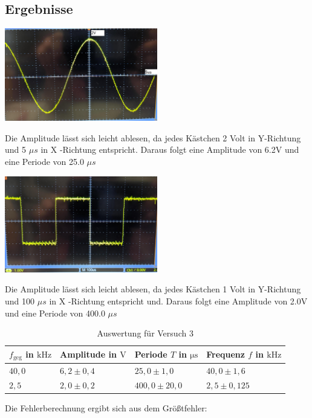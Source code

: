     \subsection{Ergebnisse}

       	\begin{center}
       	\includegraphics[width=0.5\textwidth]{bilder/Sinus.png}
       	\label{fig:versuch3sinus}
       \end{center}
		Die Amplitude lässt sich leicht ablesen, da jedes Kästchen 2 Volt in Y-Richtung und 5 $\mu s$ in X -Richtung entspricht. Daraus folgt eine Amplitude von 6.2V und eine Periode von 25.0 $\mu s$
	\begin{center}
	\includegraphics[width=0.5\textwidth]{bilder/Eckig.png}
	\label{fig:versuch3eckig}
\end{center}
Die Amplitude lässt sich leicht ablesen, da jedes Kästchen 1 Volt in Y-Richtung und 100 $\mu s$ in X -Richtung entspricht und. Daraus folgt eine Amplitude von 2.0V und eine Periode von 400.0 $\mu s$
        \begin{table}[h!]
            \centering
            \begin{tabular}{|l|l|l|l|}
                \hline
                $f_{\mathrm{geg}}$ in $\mathrm{kHz}$ & Amplitude in $\mathrm{V}$ & Periode $T$ in $\mathrm{\mu s}$ & Frequenz $f$ in $\mathrm{kHz}$\\
                \hline\hline
                $40,0$ & $6,2 \pm 0,4$ & $25,0 \pm 1,0$ & $40,0 \pm 1,6$\\
                \hline
                $2,5$ & $2,0 \pm 0,2$ & $400,0 \pm 20,0$ & $2,5 \pm 0,125$\\
                \hline
            \end{tabular}
            \caption{Auswertung für Versuch 3}
            \label{tab:versuch3}
        \end{table}
\newpage
        Die Fehlerberechnung ergibt sich aus dem Größtfehler:

